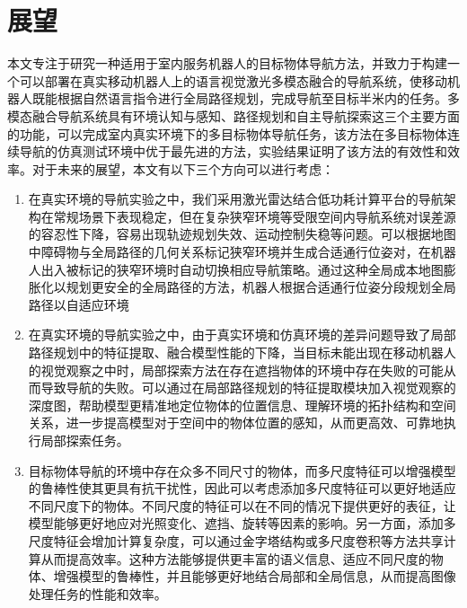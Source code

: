 \section{展望}

本文专注于研究一种适用于室内服务机器人的目标物体导航方法，并致力于构建一个可以部署在真实移动机器人上的语言视觉激光多模态融合的导航系统，使移动机器人既能根据自然语言指令进行全局路径规划，完成导航至目标半米内的任务。多模态融合导航系统具有环境认知与感知、路径规划和自主导航探索这三个主要方面的功能，可以完成室内真实环境下的多目标物体导航任务，该方法在多目标物体连续导航的仿真测试环境中优于最先进的方法，实验结果证明了该方法的有效性和效率。对于未来的展望，本文有以下三个方向可以进行考虑：
\begin{enumerate}[topsep = 0 pt, itemsep= 0 pt, parsep=0pt, partopsep=0pt, leftmargin=44pt, itemindent=0pt, labelsep=6pt, label=(\arabic*)]
    \item 	在真实环境的导航实验之中，我们采用激光雷达结合低功耗计算平台的导航架构在常规场景下表现稳定，但在复杂狭窄环境等受限空间内导航系统对误差源的容忍性下降，容易出现轨迹规划失效、运动控制失稳等问题。可以根据地图中障碍物与全局路径的几何关系标记狭窄环境并生成合适通行位姿对，在机器人出入被标记的狭窄环境时自动切换相应导航策略。通过这种全局成本地图膨胀化以规划更安全的全局路径的方法，机器人根据合适通行位姿分段规划全局路径以自适应环境
    \item	在真实环境的导航实验之中，由于真实环境和仿真环境的差异问题导致了局部路径规划中的特征提取、融合模型性能的下降，当目标未能出现在移动机器人的视觉观察之中时，局部探索方法在存在遮挡物体的环境中存在失败的可能从而导致导航的失败。可以通过在局部路径规划的特征提取模块加入视觉观察的深度图，帮助模型更精准地定位物体的位置信息、理解环境的拓扑结构和空间关系，进一步提高模型对于空间中的物体位置的感知，从而更高效、可靠地执行局部探索任务。
    \item	目标物体导航的环境中存在众多不同尺寸的物体，而多尺度特征可以增强模型的鲁棒性使其更具有抗干扰性，因此可以考虑添加多尺度特征可以更好地适应不同尺度下的物体。不同尺度的特征可以在不同的情况下提供更好的表征，让模型能够更好地应对光照变化、遮挡、旋转等因素的影响。另一方面，添加多尺度特征会增加计算复杂度，可以通过金字塔结构或多尺度卷积等方法共享计算从而提高效率。这种方法能够提供更丰富的语义信息、适应不同尺度的物体、增强模型的鲁棒性，并且能够更好地结合局部和全局信息，从而提高图像处理任务的性能和效率。 
    
\end{enumerate}


